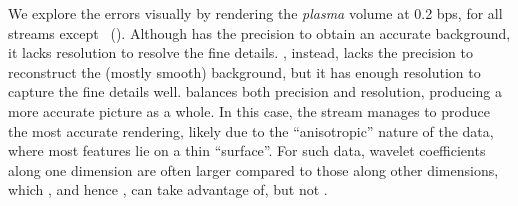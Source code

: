 We explore the errors visually by rendering the \emph{plasma} volume at 0.2 bps, for all streams
except \srop ~(). Although \slvl has the precision to obtain an accurate
background, it lacks resolution to resolve the fine details. \sbit, instead, lacks the precision to
reconstruct the (mostly smooth) background, but it has enough resolution to capture the fine details
well. \swav balances both precision and resolution, producing a more accurate picture as a whole. In
this case, the \ssig stream manages to produce the most accurate rendering, likely due to the
``anisotropic'' nature of the data, where most features lie on a thin ``surface''. For such data,
wavelet coefficients along one dimension are often larger compared to those along other dimensions,
which \srop, and hence \srsg, can take advantage of, but not \swav.
